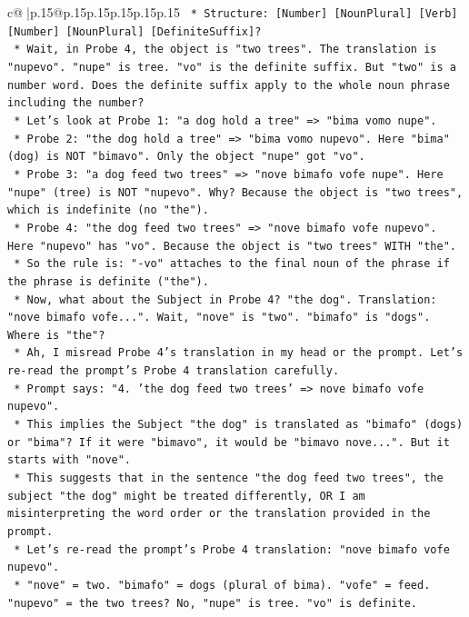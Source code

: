 \documentclass{article}
\begin{document}
{\begin{supertabular}{c@{$\;$}|p{.15\linewidth}@{}p{.15\linewidth}p{.15\linewidth}p{.15\linewidth}p{.15\linewidth}p{.15\linewidth}}
{{{\texttt{        *   Structure: {[}Number{]} {[}NounPlural{]} {[}Verb{]} {[}Number{]} {[}NounPlural{]} {[}DefiniteSuffix{]}?} \\
\texttt{        *   Wait, in Probe 4, the object is "two trees". The translation is "nupevo". "nupe" is tree. "vo" is the definite suffix. But "two" is a number word. Does the definite suffix apply to the whole noun phrase including the number?} \\
\texttt{        *   Let's look at Probe 1: "a dog hold a tree" => "bima vomo nupe".} \\
\texttt{        *   Probe 2: "the dog hold a tree" => "bima vomo nupevo". Here "bima" (dog) is NOT "bimavo". Only the object "nupe" got "vo".} \\
\texttt{        *   Probe 3: "a dog feed two trees" => "nove bimafo vofe nupe". Here "nupe" (tree) is NOT "nupevo". Why? Because the object is "two trees", which is indefinite (no "the").} \\
\texttt{        *   Probe 4: "the dog feed two trees" => "nove bimafo vofe nupevo". Here "nupevo" has "vo". Because the object is "two trees" WITH "the".} \\
\texttt{        *   So the rule is: "{-}vo" attaches to the final noun of the phrase if the phrase is definite ("the").} \\
\texttt{        *   Now, what about the Subject in Probe 4? "the dog". Translation: "nove bimafo vofe...". Wait, "nove" is "two". "bimafo" is "dogs". Where is "the"?} \\
\texttt{        *   Ah, I misread Probe 4's translation in my head or the prompt. Let's re{-}read the prompt's Probe 4 translation carefully.} \\
\texttt{        *   Prompt says: "4. 'the dog feed two trees' => nove bimafo vofe nupevo".} \\
\texttt{        *   This implies the Subject "the dog" is translated as "bimafo" (dogs) or "bima"? If it were "bimavo", it would be "bimavo nove...". But it starts with "nove".} \\
\texttt{        *   This suggests that in the sentence "the dog feed two trees", the subject "the dog" might be treated differently, OR I am misinterpreting the word order or the translation provided in the prompt.} \\
\texttt{        *   Let's re{-}read the prompt's Probe 4 translation: "nove bimafo vofe nupevo".} \\
\texttt{        *   "nove" = two. "bimafo" = dogs (plural of bima). "vofe" = feed. "nupevo" = the two trees? No, "nupe" is tree. "vo" is definite.} \\
}}}
\end{supertabular}}
\end{document}
